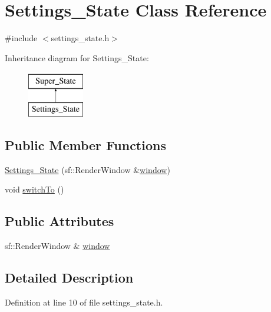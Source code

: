 \hypertarget{class_settings___state}{}\section{Settings\+\_\+\+State Class Reference}
\label{class_settings___state}


{\ttfamily \#include $<$settings\+\_\+state.\+h$>$}

Inheritance diagram for Settings\+\_\+\+State\+:\begin{figure}[H]
\begin{center}
\leavevmode
\includegraphics[height=2.000000cm]{class_settings___state}
\end{center}
\end{figure}
\subsection*{Public Member Functions}
\begin{DoxyCompactItemize}
\item 
\hyperlink{class_settings___state_a3b7db311952a3a13613e04a776d90ea5}{Settings\+\_\+\+State} (sf\+::\+Render\+Window \&\hyperlink{class_settings___state_ac560b251f0f6211bac46099994fa30eb}{window})
\item 
void \hyperlink{class_settings___state_a074aa49707b3a4fe530a105f274db1ae}{switch\+To} ()
\end{DoxyCompactItemize}
\subsection*{Public Attributes}
\begin{DoxyCompactItemize}
\item 
sf\+::\+Render\+Window \& \hyperlink{class_settings___state_ac560b251f0f6211bac46099994fa30eb}{window}
\end{DoxyCompactItemize}


\subsection{Detailed Description}


Definition at line 10 of file settings\+\_\+state.\+h.



